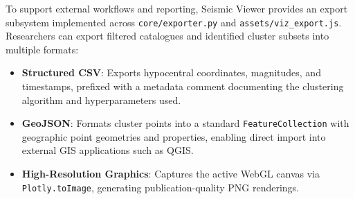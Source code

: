 To support external workflows and reporting, Seismic Viewer provides an export subsystem implemented across \texttt{core/exporter.py} and \texttt{assets/viz\_export.js}. Researchers can export filtered catalogues and identified cluster subsets into multiple formats:
\begin{itemize}
    \item \textbf{Structured CSV}: Exports hypocentral coordinates, magnitudes, and timestamps, prefixed with a metadata comment documenting the clustering algorithm and hyperparameters used.
    \item \textbf{GeoJSON}: Formats cluster points into a standard \texttt{FeatureCollection} with geographic point geometries and properties, enabling direct import into external GIS applications such as QGIS.
    \item \textbf{High-Resolution Graphics}: Captures the active WebGL canvas via \texttt{Plotly.\allowbreak toImage}, generating publication-quality PNG renderings.
\end{itemize}
